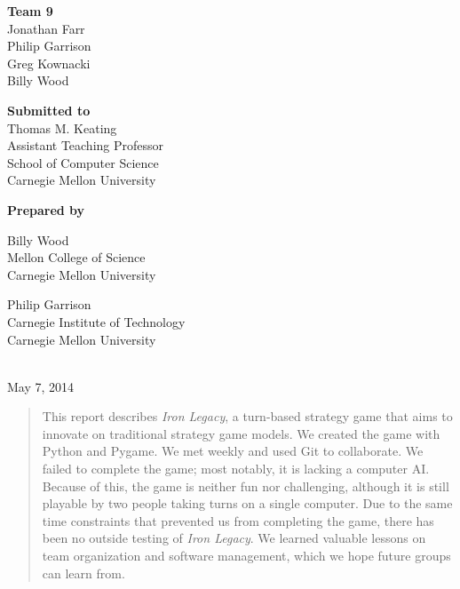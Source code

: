 \documentclass{article}
\begin{document}
\vspace{4em}

\begin{center}
\textbf{Team 9}\\
Jonathan Farr\\
Philip Garrison\\
Greg Kownacki\\
Billy Wood
\end{center}

\vspace{4em}

\begin{center}
\textbf{Submitted to}\\
Thomas M. Keating\\
Assistant Teaching Professor\\
School of Computer Science\\
Carnegie Mellon University
\end{center}

\vspace{4em}

\begin{center}
\textbf{Prepared by}\\
\begin{minipage}[c][3.7em][t]{.45\textwidth}
\begin{center}
Billy Wood\\
Mellon College of Science\\
Carnegie Mellon University
\end{center}
\end{minipage}
\begin{minipage}[c][3.7em][t]{.45\textwidth}
\begin{center}
Philip Garrison\\
Carnegie Institute of Technology\\
Carnegie Mellon University
\end{center}
\end{minipage}\\
May 7, 2014
\end{center}

\vfill


\begin{abstract}
This report describes \emph{Iron Legacy}, a turn-based strategy game that aims 
to innovate on traditional strategy game models. We created the game with 
Python and Pygame. We met weekly and used Git to collaborate. We failed to 
complete the game; most notably, it is lacking a computer AI. Because of this, 
the game is neither fun nor challenging, although it is still playable by two
people taking turns on a single computer. Due to the same time constraints that 
prevented us from completing the game, there has been no outside testing of 
\emph{Iron Legacy}. We learned valuable lessons on team organization and 
software management, which we hope future groups can learn from.
\end{abstract}
\end{document}
